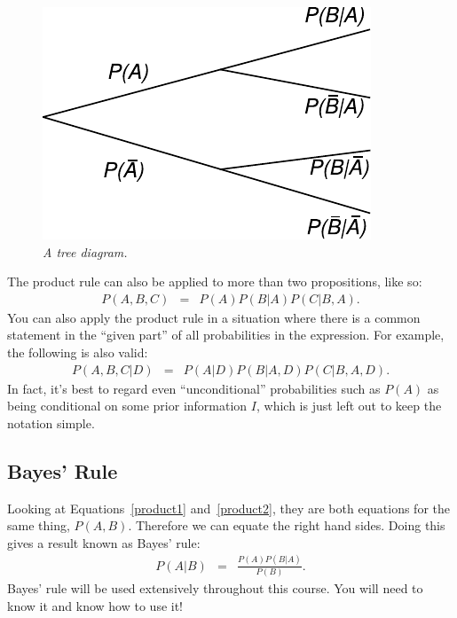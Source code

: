 \begin{figure}[!ht]
\begin{center}
\includegraphics[scale=0.9]{Figures/tree_diagram.pdf}
\caption{\it A tree diagram.\label{fig:tree_diagram}}
\end{center}
\end{figure}

The product rule can also be applied to more than two propositions, like so:
\begin{eqnarray}
P(A, B, C) &=& P(A)P(B|A)P(C|B,A).
\end{eqnarray}
You can also apply the product rule in a situation where there is a common
statement in the ``given part'' of all probabilities in the expression. For
example, the following is also valid:
\begin{eqnarray}
P(A, B, C | D) &=& P(A |D)P(B|A,D)P(C|B,A,D).
\end{eqnarray}
In fact, it's best to regard even ``unconditional'' probabilities such
as $P(A)$ as being conditional on some prior information $I$, which is just
left out to keep the notation simple.

\subsection{Bayes' Rule}
Looking at Equations~\ref{product1} and~\ref{product2}, they are both equations
for the same
thing, $P(A,B)$. Therefore we can equate the right hand sides. Doing this gives
a result known as Bayes' rule:
\begin{eqnarray}
P(A|B) &=& \frac{P(A)P(B|A)}{P(B)}. \label{bayes}
\end{eqnarray}
Bayes' rule will be used extensively throughout this course. You will need to
know it and know how to use it!

